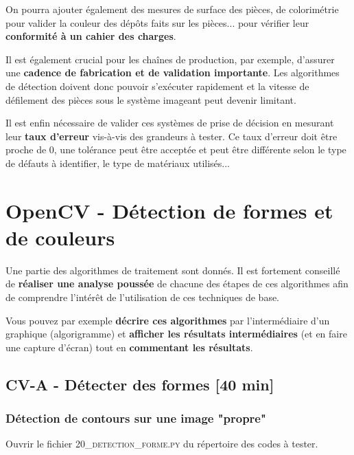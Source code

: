 \documentclass[a4paper,11pt,titlepage]{article} %
\begin{document}
On pourra ajouter également des mesures de surface des pièces, de colorimétrie pour valider la couleur des dépôts faits sur les pièces... pour vérifier leur \textbf{conformité à un cahier des charges}.

\medskip

Il est également crucial pour les chaînes de production, par exemple, d'assurer une \textbf{cadence de fabrication et de validation importante}. Les algorithmes de détection doivent donc pouvoir s'exécuter rapidement et la vitesse de défilement des pièces sous le système imageant peut devenir limitant.

Il est enfin nécessaire de valider ces systèmes de prise de décision en mesurant leur \textbf{taux d'erreur} vis-à-vis des grandeurs à tester. Ce taux d'erreur doit être proche de 0, une tolérance peut être acceptée et peut être différente selon le type de défauts à identifier, le type de matériaux utilisés...

\newpage


\section{OpenCV - Détection de formes et de couleurs}

Une partie des algorithmes de traitement sont donnés. Il est fortement conseillé de \textbf{réaliser une analyse poussée} de chacune des étapes de ces algorithmes afin de comprendre l'intérêt de l'utilisation de ces techniques de base.

Vous pouvez par exemple \textbf{décrire ces algorithmes} par l'intermédiaire d'un graphique (algorigramme) et \textbf{afficher les résultats intermédiaires} (et en faire une capture d'écran) tout en \textbf{commentant les résultats}. 

\subsection{CV-A - Détecter des formes {[40 min]}}

\subsubsection{Détection de contours sur une image "propre"}

\Manip Ouvrir le fichier \textsc{20\_detection\_forme.py} du répertoire des codes à tester.
\end{document}
